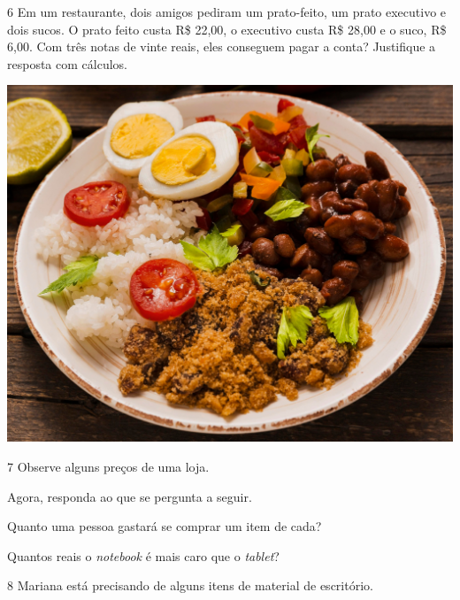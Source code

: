 \num{6} Em um restaurante, dois amigos pediram um prato-feito, um prato executivo
e dois sucos. O prato feito custa R\$ 22,00, o executivo custa R\$
28,00 e o suco, R\$ 6,00. Com três notas de vinte reais, eles
conseguem pagar a conta? Justifique a resposta com cálculos.

\begin{center}
\includegraphics[width=.5\textwidth]{media/image37c.jpg}
\end{center}


\num{7} Observe alguns preços de uma loja.


Agora, responda ao que se pergunta a seguir.

\begin{escolha}
\item
  Quanto uma pessoa gastará se comprar um item de cada?

\item
  Quantos reais o \textit{notebook} é mais caro que o \textit{tablet}?
\end{escolha}

\pagebreak

\num{8} Mariana está precisando de alguns itens de material de escritório.

